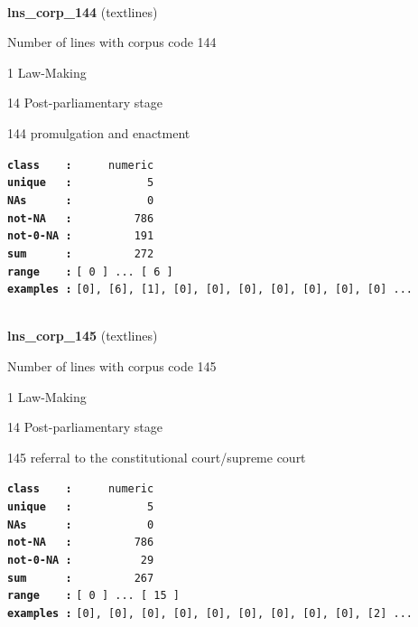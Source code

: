 \documentclass[]{article}
\begin{document}
~

\textbf{lns\_corp\_144} (textlines)

Number of lines with corpus code 144

1 Law-Making

14 Post-parliamentary stage

144 promulgation and enactment

\textbf{\texttt{class\ \ \ \ :}} \texttt{~~~~~numeric}\\
\textbf{\texttt{unique\ \ \ :}} \texttt{~~~~~~~~~~~5}\\
\textbf{\texttt{NAs\ \ \ \ \ \ :}} \texttt{~~~~~~~~~~~0}\\
\textbf{\texttt{not-NA\ \ \ :}} \texttt{~~~~~~~~~786}\\
\textbf{\texttt{not-0-NA\ :}} \texttt{~~~~~~~~~191}\\
\textbf{\texttt{sum\ \ \ \ \ \ :}} \texttt{~~~~~~~~~272}\\
\textbf{\texttt{range\ \ \ \ :}}
\texttt{{[}\ 0\ {]}\ ...\ {[}\ 6\ {]}}\\
\textbf{\texttt{examples\ :}}
\texttt{{[}0{]},\ {[}6{]},\ {[}1{]},\ {[}0{]},\ {[}0{]},\ {[}0{]},\ {[}0{]},\ {[}0{]},\ {[}0{]},\ {[}0{]}\ ...}\\

~

\textbf{lns\_corp\_145} (textlines)

Number of lines with corpus code 145

1 Law-Making

14 Post-parliamentary stage

145 referral to the constitutional court/supreme court

\textbf{\texttt{class\ \ \ \ :}} \texttt{~~~~~numeric}\\
\textbf{\texttt{unique\ \ \ :}} \texttt{~~~~~~~~~~~5}\\
\textbf{\texttt{NAs\ \ \ \ \ \ :}} \texttt{~~~~~~~~~~~0}\\
\textbf{\texttt{not-NA\ \ \ :}} \texttt{~~~~~~~~~786}\\
\textbf{\texttt{not-0-NA\ :}} \texttt{~~~~~~~~~~29}\\
\textbf{\texttt{sum\ \ \ \ \ \ :}} \texttt{~~~~~~~~~267}\\
\textbf{\texttt{range\ \ \ \ :}}
\texttt{{[}\ 0\ {]}\ ...\ {[}\ 15\ {]}}\\
\textbf{\texttt{examples\ :}}
\texttt{{[}0{]},\ {[}0{]},\ {[}0{]},\ {[}0{]},\ {[}0{]},\ {[}0{]},\ {[}0{]},\ {[}0{]},\ {[}0{]},\ {[}2{]}\ ...}\\
\end{document}
